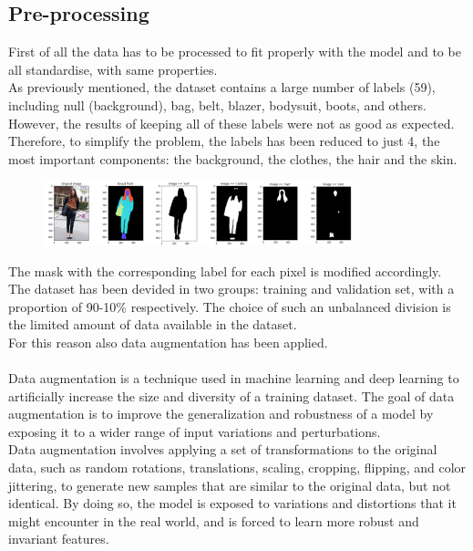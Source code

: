 \documentclass{article}
\begin{document}
\subsection{Pre-processing}
First of all the data has to be processed to fit properly with the model and to be all standardise, with same properties.\\
As previously mentioned, the dataset contains a large number of labels (59), including null (background), bag, belt, blazer, bodysuit, boots, and others.\\
However, the results of keeping all of these labels were not as good as expected. Therefore, to simplify the problem, the labels has been reduced to just 4, the most important components: the background, the clothes, the hair and the skin.
\begin{figure}[H]
    \begin{center}
    \includegraphics[width=0.8\textwidth]{img/4Components.png}
    \label{fig:4comp}
\end{center}
\end{figure}
The mask with the corresponding label for each pixel is modified accordingly.\\
The dataset has been devided in two groups: training and validation set, with a proportion of 90-10\% respectively. The choice of such an unbalanced division is the limited amount of data available in the dataset.\\ For this reason also data augmentation has been applied.\\\\
Data augmentation is a technique used in machine learning and deep learning to artificially increase the size and diversity of a training dataset. The goal of data augmentation is to improve the generalization and robustness of a model by exposing it to a wider range of input variations and perturbations.\\
Data augmentation involves applying a set of transformations to the original data, such as random rotations, translations, scaling, cropping, flipping, and color jittering, to generate new samples that are similar to the original data, but not identical.
By doing so, the model is exposed to variations and distortions that it might encounter in the real world, and is forced to learn more robust and invariant features.\\
\end{document}
